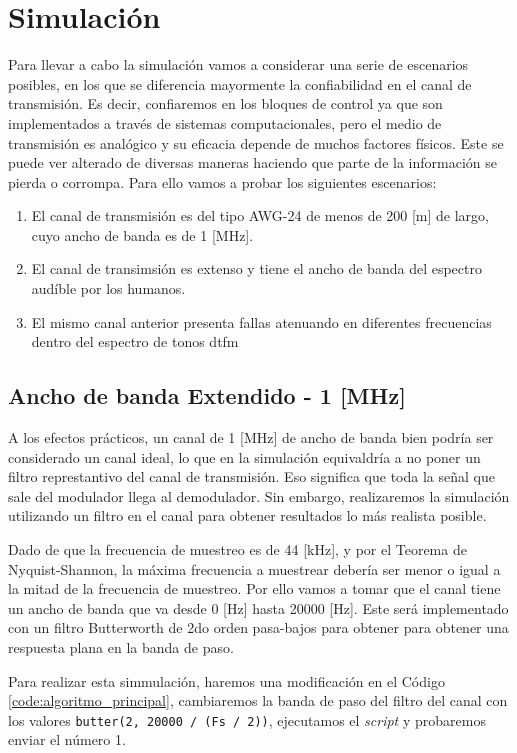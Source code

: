 \section{Simulación}
Para llevar a cabo la simulación vamos a considerar una serie de escenarios posibles, en los que se diferencia mayormente la confiabilidad en el canal de transmisión. Es decir, confiaremos en los bloques de control ya que son implementados a través de sistemas computacionales, pero el medio de transmisión es analógico y su eficacia depende de muchos factores físicos. Este se puede ver alterado de diversas maneras haciendo que parte de la información se pierda o corrompa. Para ello vamos a probar los siguientes escenarios:

\begin{enumerate}
  \item El canal de transmisión es del tipo AWG-24 de menos de 200 [m] de largo, cuyo ancho de banda es de 1 [MHz].
  \item El canal de transimsión es extenso y tiene el ancho de banda del espectro audíble por los humanos.
  \item El mismo canal anterior presenta fallas atenuando en diferentes frecuencias dentro del espectro de tonos \gls{dtfm}
\end{enumerate}

\subsection{Ancho de banda Extendido - 1 [MHz]}
A los efectos prácticos, un canal de 1 [MHz] de ancho de banda bien podría ser considerado un canal ideal, lo que en la simulación equivaldría a no poner un filtro represtantivo del canal de transmisión. Eso significa que toda la señal que sale del modulador llega al demodulador. Sin embargo, realizaremos la simulación utilizando un filtro en el canal para obtener resultados lo más realista posible.

Dado de que la frecuencia de muestreo es de 44 [kHz], y por el Teorema de Nyquist-Shannon, la máxima frecuencia a muestrear debería ser menor o igual a la mitad de la frecuencia de muestreo. Por ello vamos a tomar que el canal tiene un ancho de banda que va desde 0 [Hz] hasta 20000 [Hz]. Este será implementado con un filtro Butterworth de 2do orden pasa-bajos para obtener para obtener una respuesta plana en la banda de paso.

Para realizar esta simmulación, haremos una modificación en el Código \ref{code:algoritmo_principal}, cambiaremos la banda de paso del filtro del canal con los valores \lstinline{butter(2, 20000 / (Fs / 2))}, ejecutamos el \textit{script} y probaremos enviar el número 1.

